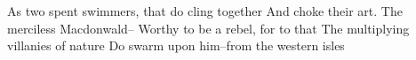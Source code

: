 As two spent swimmers, that do cling together
And choke their art. The merciless Macdonwald--
Worthy to be a rebel, for to that
The multiplying villanies of nature
Do swarm upon him--from the western isles

